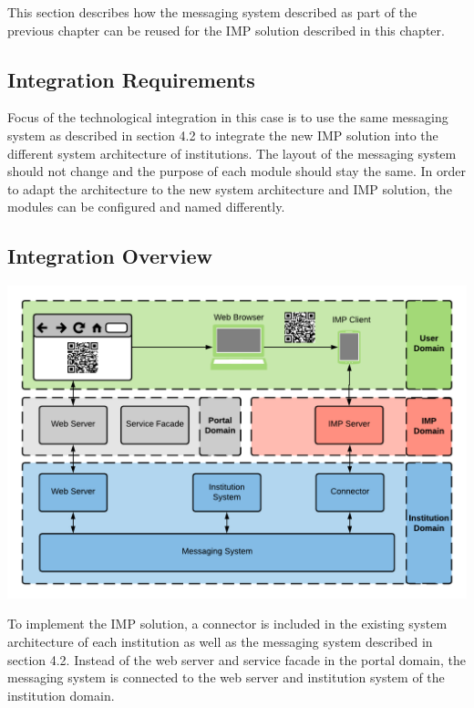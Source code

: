 This section describes how the messaging system described as part of the previous chapter can be reused for the IMP solution described in this chapter.

\subsection{Integration Requirements}

Focus of the technological integration in this case is to use the same messaging system as described in section 4.2 to integrate the new IMP solution into the different system architecture of institutions. The layout of the messaging system should not change and the purpose of each module should stay the same. In order to adapt the architecture to the new system architecture and IMP solution, the modules can be configured and named differently.

\subsection{Integration Overview}

\begin{center}
    \includegraphics[scale=0.6]{Diagrams/Integration Architecture 2/Technological Integration/1. Integration Overview.pdf}
\end{center}

To implement the IMP solution, a connector is included in the existing system architecture of each institution as well as the messaging system described in section 4.2. Instead of the web server and service facade in the portal domain, the messaging system is connected to the web server and institution system of the institution domain.

